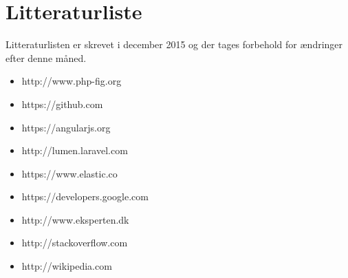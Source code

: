 \section{Litteraturliste}
Litteraturlisten er skrevet i december 2015 og der tages forbehold for ændringer efter denne måned.
\begin{itemize}
    \item{http://www.php-fig.org}
    \item{https://github.com}
    \item{https://angularjs.org}
    \item{http://lumen.laravel.com}
    \item{https://www.elastic.co}
    \item{https://developers.google.com}
    \item{http://www.eksperten.dk}
    \item{http://stackoverflow.com}
    \item{http://wikipedia.com}
\end{itemize}
